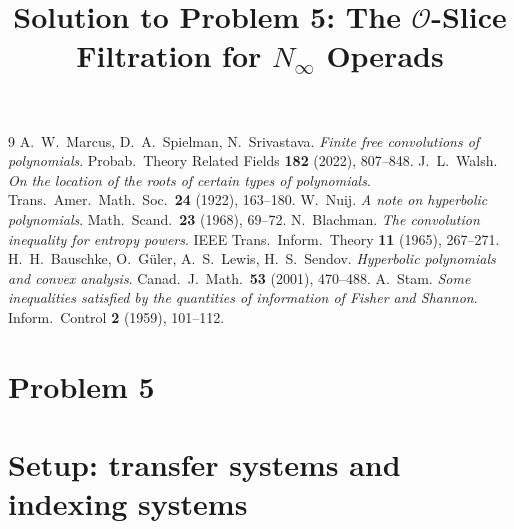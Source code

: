 \documentclass[11pt]{article}
\begin{document}
\begin{thebibliography}{9}
 A.~W.~Marcus, D.~A.~Spielman, N.~Srivastava.
  \emph{Finite free convolutions of polynomials}.
  Probab.\ Theory Related Fields \textbf{182} (2022), 807--848.
 J.~L.~Walsh.
  \emph{On the location of the roots of certain types of polynomials}.
  Trans.\ Amer.\ Math.\ Soc.\ \textbf{24} (1922), 163--180.
 W.~Nuij.
  \emph{A note on hyperbolic polynomials}.
  Math.\ Scand.\ \textbf{23} (1968), 69--72.
 N.~Blachman.
  \emph{The convolution inequality for entropy powers}.
  IEEE Trans.\ Inform.\ Theory \textbf{11} (1965), 267--271.
 H.~H.~Bauschke, O.~G\"uler, A.~S.~Lewis, H.~S.~Sendov.
  \emph{Hyperbolic polynomials and convex analysis}.
  Canad.\ J.\ Math.\ \textbf{53} (2001), 470--488.
 A.~Stam.
  \emph{Some inequalities satisfied by the quantities of information of Fisher
  and Shannon}. Inform.\ Control \textbf{2} (1959), 101--112.
\end{thebibliography}

\endgroup

\clearpage
\section*{Problem 5}
\begingroup
\hypersetup{colorlinks=true,
            linkcolor=blue!50!black,
            citecolor=blue!50!black,
            urlcolor=blue!50!black}
\newcommand{\qfiveaO}{\mathcal{O}}
\newcommand{\qfiveSp}{\mathrm{Sp}}
\newcommand{\qfiveZ}{\mathbb{Z}}
\newcommand{\qfiveR}{\mathbb{R}}
\newcommand{\qfivegconn}{\operatorname{gconn}}
\newcommand{\qfiveconn}{\operatorname{conn}}
\newcommand{\qfiveSub}{\operatorname{Sub}}
\newcommand{\qfiveMap}{\operatorname{Map}}
\newtheorem{qfivetheorem}{Theorem}
\newtheorem{qfivelemma}{Lemma}
\newtheorem{qfiveproposition}{Proposition}
\newtheorem{qfivecorollary}{Corollary}
\theoremstyle{definition}
\newtheorem{qfivedefinition}{Definition}
\newtheorem{qfiveremark}{Remark}
\title{Solution to Problem 5: The $\qfiveaO$-Slice Filtration for $N_\infty$ Operads}
\author{}
\date{}
\maketitle


\section*{Setup: transfer systems and indexing systems}
\end{document}
